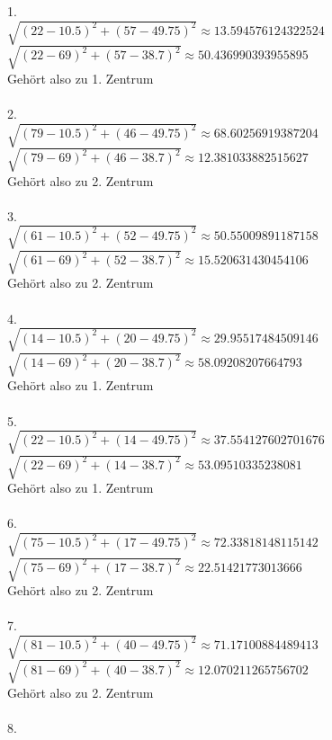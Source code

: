 \begin{enumerate}
1. \\ 
$\sqrt{(22-10.5)^2 + (57-49.75)^2} \approx 13.594576124322524$ \\ 
$\sqrt{(22-69)^2 + (57-38.7)^2} \approx 50.436990393955895$ \\ 
Gehört also zu 1. Zentrum \\ \\
2. \\ 
$\sqrt{(79-10.5)^2 + (46-49.75)^2} \approx 68.60256919387204$ \\ 
$\sqrt{(79-69)^2 + (46-38.7)^2} \approx 12.381033882515627$ \\ 
Gehört also zu 2. Zentrum \\ \\
3. \\ 
$\sqrt{(61-10.5)^2 + (52-49.75)^2} \approx 50.55009891187158$ \\ 
$\sqrt{(61-69)^2 + (52-38.7)^2} \approx 15.520631430454106$ \\ 
Gehört also zu 2. Zentrum \\ \\
4. \\ 
$\sqrt{(14-10.5)^2 + (20-49.75)^2} \approx 29.95517484509146$ \\ 
$\sqrt{(14-69)^2 + (20-38.7)^2} \approx 58.09208207664793$ \\ 
Gehört also zu 1. Zentrum \\ \\
5. \\ 
$\sqrt{(22-10.5)^2 + (14-49.75)^2} \approx 37.554127602701676$ \\ 
$\sqrt{(22-69)^2 + (14-38.7)^2} \approx 53.09510335238081$ \\ 
Gehört also zu 1. Zentrum \\ \\
6. \\ 
$\sqrt{(75-10.5)^2 + (17-49.75)^2} \approx 72.33818148115142$ \\ 
$\sqrt{(75-69)^2 + (17-38.7)^2} \approx 22.51421773013666$ \\ 
Gehört also zu 2. Zentrum \\ \\
7. \\ 
$\sqrt{(81-10.5)^2 + (40-49.75)^2} \approx 71.17100884489413$ \\ 
$\sqrt{(81-69)^2 + (40-38.7)^2} \approx 12.070211265756702$ \\ 
Gehört also zu 2. Zentrum \\ \\
8. \\ 

\end{enumerate}
